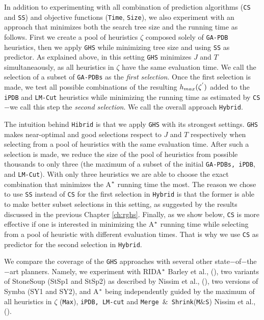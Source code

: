 In addition to experimenting with all combination of prediction algorithms (\texttt{CS} and \texttt{SS}) and objective functions (\texttt{Time}, \texttt{Size}), we also experiment with an approach that minimizes both the search tree size and the running time as follows. First we create a pool of heuristics $\zeta$ composed solely of \texttt{GA-PDB} heuristics, then we apply \texttt{GHS} while minimizing tree size and using \texttt{SS} as predictor. As explained above, in this setting \texttt{GHS} minimizes $J$ and $T$ simultaneaously, as all heuristics in $\zeta$ have the same evaluation time. We call the selection of a subset of \texttt{GA-PDBs} as the \textit{first selection}. Once the first selection is made, we test all possible combinations of the resulting $h_{max}(\zeta\sp{'})$ added to the \texttt{iPDB} and \texttt{LM-Cut} heuristics while minimizing the running time as estimated by \texttt{CS}$-$we call this step the \textit{second selection}. We call the overall approach \texttt{Hybrid}.

The intuition behind \texttt{Hibrid} is that we apply \texttt{GHS} with its strongest settings. \texttt{GHS} makes near-optimal and good selections respect to $J$ and $T$ respectively when selecting from a pool of heuristics with the same evaluation time. After such a selection is made, we reduce the size of the pool of heuristics from possible thousands to only three (the maximum of a subset of the initial \texttt{GA-PDBs, iPDB}, and \texttt{LM-Cut}). With only three heuristics we are able to choose the exact combination that minimizes the A$\sp{*}$ running time the most. The reason we chose to use \texttt{SS} instead of \texttt{CS} for the first selection in \texttt{Hybrid} is that the former is able to make better subset selections in this setting, as suggested by the results discussed in the previous Chapter \ref{ch:rghs}. Finally, as we show below, \texttt{CS} is more effective if one is interested in minimizing the A$\sp{*}$ running time while selecting from a pool of heuristic with different evaluation times. That is why we use \texttt{CS} as predictor for the second selection in \texttt{Hybrid}.

We compare the coverage of the \texttt{GHS} approaches with several other state$-$of$-$the$-$art planners. Namely, we experiment with RIDA$\sp{*}$ Barley et al., (\citeyear{BarleySantiagoOver}), two variants of StoneSoup (StSp1 and StSp2) as described by Nissim et al., (\citeyear{nissim2011computing}), two versions of Symba (SY1 and SY2), and A$\sp{*}$ being independently guided by the maximum of all heuristics in $\zeta$ (\texttt{Max}), \texttt{iPDB, LM-cut} and \texttt{Merge $\&$ Shrink}(\texttt{M$\&$S}) Nissim et al., (\citeyear{nissim2011computing}).

